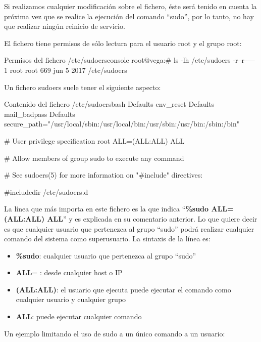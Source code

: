 \documentclass{../../../yukibook.cls/yukibook}
\begin{document}
Si realizamos cualquier modificación sobre el fichero, éste será tenido en cuenta la próxima vez que se realice la ejecución del comando “sudo”, por lo tanto, no hay que realizar ningún reinicio de servicio.

El fichero   tiene permisos de sólo lectura para el usuario root y el grupo root:

\begin{mycode}{Permisos del fichero \faFile \hspace{1pt} /etc/sudoers}{console}{}
root@vega:# ls -lh /etc/sudoers
-r--r----- 1 root root 669 jun  5  2017 /etc/sudoers
\end{mycode}

Un fichero sudoers suele tener el siguiente aspecto:

\begin{mycode}{Contenido del fichero \faFile \hspace{1pt} /etc/sudoers}{bash}{\footnotesize}
Defaults    env_reset
Defaults    mail_badpass
Defaults    secure_path="/usr/local/sbin:/usr/local/bin:/usr/sbin:/usr/bin:/sbin:/bin"

# User privilege specification
root    ALL=(ALL:ALL) ALL

# Allow members of group sudo to execute any command

# See sudoers(5) for more information on "#include" directives:

#includedir /etc/sudoers.d
\end{mycode}

La línea que más importa en este fichero es la que indica “\textbf{\%sudo   ALL=(ALL:ALL) ALL}” y es explicada en su comentario anterior. Lo que quiere decir es que cualquier usuario que pertenezca al grupo “sudo” podrá realizar cualquier comando del sistema como superusuario. La sintaxis de la línea es:

\begin{itemize}
    \item \textbf{\%sudo}:  cualquier usuario que pertenezca al grupo “sudo”
    \item \textbf{ALL}= : desde cualquier host o IP
    \item \textbf{(ALL:ALL)}: el usuario que ejecuta puede ejecutar el comando como cualquier usuario y cualquier grupo
    \item \textbf{ALL}: puede ejecutar cualquier comando
\end{itemize}

Un ejemplo limitando el uso de sudo a un único comando a un usuario:
\end{document}
